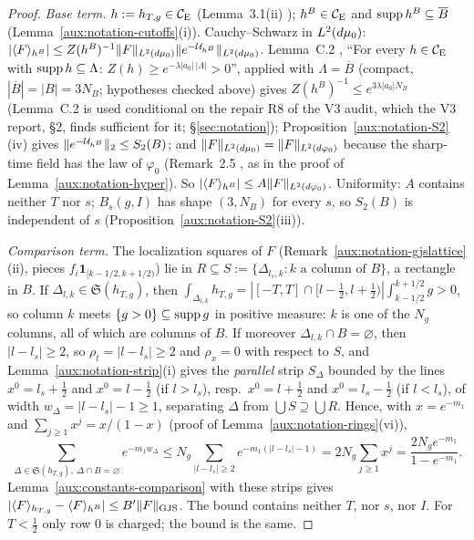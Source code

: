 \begin{proof}
\emph{Base term.}  $h:=h_{T,g}\in\mathcal{C}_{\mathrm E}$ (Lemma~3.1(ii) \cite[p.~15]{R}); $h^B\in\mathcal{C}_{\mathrm E}$ and $\operatorname{supp}
h^B\subseteq\overline B$ (Lemma~\ref{aux:notation-cutoffs}(i)).  Cauchy--Schwarz in
$L^2(d\mu_0)$:
$|\langle F\rangle_{h^B}|\le Z(h^B)^{-1}\|F\|_{L^2(d\mu_0)}\|e^{-\mathcal U_{h^B}}\|_{L^2(d\mu_0)}$.  Lemma~C.2
\cite[p.~40]{R}, ``For every $h\in\mathcal{C}_{\mathrm E}$ with $\operatorname{supp} h\subseteq\Lambda$:
$Z(h)\ge e^{-\lambda|a_0|\,|\Lambda|}>0$'', applied with $\Lambda=\overline B$ (compact,
$|\overline B|=|B|=3N_B$; hypotheses checked above) gives $Z(h^B)^{-1}\le e^{3\lambda|a_0|N_B}$
(Lemma~C.2 is used conditional on the repair R8 of the V3 audit, which the V3 report, \S2, finds
sufficient for it; \S\ref{sec:notation});
Proposition~\ref{aux:notation-S2}(iv) gives $\|e^{-\mathcal U_{h^B}}\|_2\le S_2(B)$; and
$\|F\|_{L^2(d\mu_0)}=\|F\|_{L^2(d\varphi_0)}$ because the sharp-time field has the law of
$\varphi_0$ (Remark~2.5 \cite[p.~14]{R}, as in the proof of
Lemma~\ref{aux:notation-hyper}).  So $|\langle F\rangle_{h^B}|\le A\|F\|_{L^2(d\varphi_0)}$.  Uniformity: $A$
contains neither $T$ nor $s$; $B_s(g,I)$ has shape $(3,N_B)$ for every $s$, so $S_2(B)$ is
independent of $s$ (Proposition~\ref{aux:notation-S2}(iii)).

\emph{Comparison term.}  The localization squares of $F$ (Remark~\ref{aux:notation-gjslattice}(ii),
pieces $f_i\mathbf 1_{[k-1/2,k+1/2)}$) lie in $R\subseteq S:=\{\Delta_{l_s,k}:k\text{ a column
of }B\}$, a rectangle in $B$.  If $\Delta_{l,k}\in\mathfrak S(h_{T,g})$, then
$\int_{\Delta_{l,k}}h_{T,g}=|[-T,T]\cap[l-\frac12,l+\frac12)|\int_{k-1/2}^{k+1/2}g>0$, so
column $k$ meets $\{g>0\}\subseteq\operatorname{supp} g$ in positive measure: $k$ is one of the $N_g$
columns, all of which are columns of $B$.  If moreover $\Delta_{l,k}\cap B=\varnothing$, then
$|l-l_s|\ge2$, so $\rho_t=|l-l_s|\ge2$ and $\rho_x=0$ with respect to $S$, and
Lemma~\ref{aux:notation-strip}(i) gives the \emph{parallel} strip $S_\Delta$ bounded by the
lines $x^0=l_s+\frac12$ and $x^0=l-\frac12$ (if $l>l_s$), resp.\ $x^0=l+\frac12$ and
$x^0=l_s-\frac12$ (if $l<l_s$), of width $w_\Delta=|l-l_s|-1\ge1$, separating $\Delta$ from
$\bigcup S\supseteq\bigcup R$.  Hence, with $x=e^{-m_1}$ and $\sum_{j\ge1}x^j=x/(1-x)$ (proof of
Lemma~\ref{aux:notation-rings}(vi)),
\[
 \sum_{\Delta\in\mathfrak S(h_{T,g}),\ \Delta\cap B=\varnothing}e^{-m_1w_\Delta}
 \le N_g\sum_{|l-l_s|\ge2}e^{-m_1(|l-l_s|-1)}=2N_g\sum_{j\ge1}x^j=\frac{2N_ge^{-m_1}}{1-e^{-m_1}} .
\]
Lemma~\ref{aux:constants-comparison} with these strips gives
$|\langle F\rangle_{h_{T,g}}-\langle F\rangle_{h^B}|\le B'\lVert F\rVert_{\mathrm{GJS}}$.  The
bound contains neither $T$, nor $s$, nor $I$.  For $T<\frac12$ only row $0$ is charged; the
bound is the same.
\end{proof}

